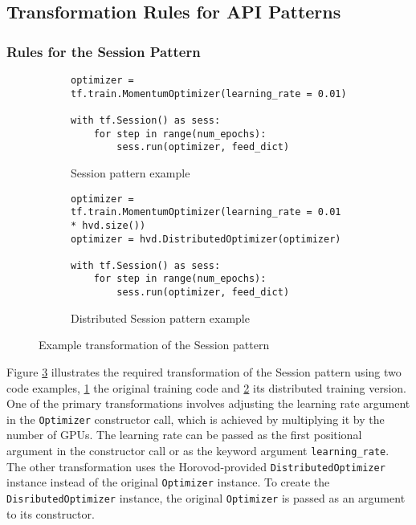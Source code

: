 \subsection{Transformation Rules for API Patterns}


\subsubsection{Rules for the Session Pattern}

\begin{figure}[ht!]\centering
  \begin{subfigure}[t]{0.9\textwidth}
    \begin{lstlisting}[style=mpython]
optimizer = tf.train.MomentumOptimizer(learning_rate = 0.01)

with tf.Session() as sess:
    for step in range(num_epochs): 
        sess.run(optimizer, feed_dict)\end{lstlisting}
    \caption{Session pattern example}
    \label{fig:trans:sessiontrans:a}
  \end{subfigure}
  \hspace{5mm}
  \begin{subfigure}[t]{0.9\textwidth}
    \begin{lstlisting}[style=mpython]
optimizer = tf.train.MomentumOptimizer(learning_rate = 0.01 * hvd.size())
optimizer = hvd.DistributedOptimizer(optimizer)

with tf.Session() as sess:
    for step in range(num_epochs): 
        sess.run(optimizer, feed_dict)\end{lstlisting}
    \caption{Distributed Session pattern example}
    \label{fig:trans:sessiontrans:b}
  \end{subfigure}
  \caption{Example transformation of the Session pattern}
  \label{fig:trans:sessiontrans}
\end{figure}

Figure \ref{fig:trans:sessiontrans} illustrates the required transformation of
the Session pattern using two code examples, \ref{fig:trans:sessiontrans:a} the
original training code and \ref{fig:trans:sessiontrans:b} its distributed
training version.
One of the primary transformations involves adjusting the learning rate
argument in the {\tt Optimizer} constructor call, which is achieved by
multiplying it by the number of GPUs.
The learning rate can be passed as the first positional argument in the
constructor call or as the keyword argument {\tt learning\_rate}.
The other transformation uses the Horovod-provided {\tt DistributedOptimizer}
instance instead of the original {\tt Optimizer} instance. 
To create the {\tt DisributedOptimizer} instance, the original {\tt Optimizer}
is passed as an argument to its constructor.


